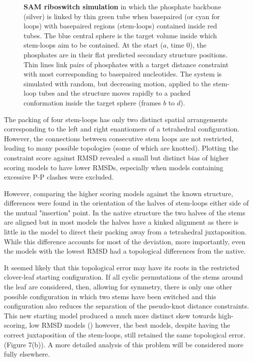 \documentclass[review]{elsarticle}
\begin{document}
{{{{{\begin{figure}
\centering
{}
\caption{
\label{Fig:myo2DFS}
{\bf SAM riboswitch simulation} in which the phosphate backbone (silver) is linked by
thin green tube when basepaired (or cyan for loops) with basepaired regions (stem-loops)
contained inside red tubes.  The blue central sphere is the target volume inside which
stem-loops aim to be contained.   At the start ($a$, time 0), the phosphates are in their
flat predicted secondary structure positions.   Thin lines link pairs of phosphates with
a target distance constraint with most corresponding to basepaired nucleotides.
The system is simulated with random, but decreasing motion, applied to the stem-loop tubes
and the structure moves rapidly to a packed conformation inside the target sphere
(frames $b$ to $d$).    
}
\end{figure}

The packing of four stem-loops has only two distinct spatial arrangements corresponding to
the left and right enantiomers of a tetrahedral configuration.   However, the connections 
between consecutive stem loops are not restricted, leading to many possible topologies
(some of which are knotted).   Plotting the constraint score against RMSD revealed a
small but distinct bias of higher scoring models to have lower RMSDs, especially when
models containing excessive P-P clashes were excluded.

However, comparing the higher scoring models against the known structure, differences
were found in the orientation of the halves of stem-loops either side of the mutual
"insertion" point.  In the native structure the two halves of the stems are aligned but
in most models the halves have a kinked alignment as there is little in the model to
direct their packing away from a tetrahedral juxtaposition.   While this difference
accounts for most of the deviation, more importantly, even the models with the lowest 
RMSD had a topological differences from the native.     

It seemed likely that this topological error may have its roots in the restricted
clover-leaf starting configuration.   If all cyclic permutations of the stems around the
leaf are considered, then, allowing for symmetry, there is only one other possible
configuration in which two stems have been switched and this configuration
also reduces the separation of the pseudo-knot distance constraints.  This new starting
model produced a much more distinct skew towards high-scoring, low RMSD models
() however, the best models, despite having the correct juxtaposition
of the stem-loops, still retained the same topological error.  (Figure 7(b)).
A more detailed analysis of this problem will be considered more fully elsewhere.

}}}}}
\end{document}
